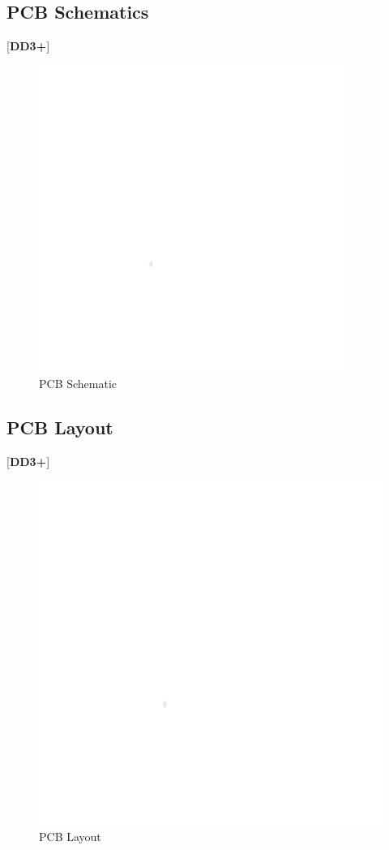 \documentclass[letterpaper, 11pt]{article}
\begin{document}
\subsection{PCB Schematics}
[\textbf{DD3+}]
\begin{figure}[!h]
    \centering
    \includegraphics[width=10cm]{images/white.png} %
    \caption{PCB Schematic}
\end{figure}

\clearpage
\subsection{PCB Layout}
[\textbf{DD3+}]
\begin{figure}[h]
    \centering
    \includegraphics[width=16cm]{images/white.png} %
    \caption{PCB Layout}
\end{figure}
\end{document}
